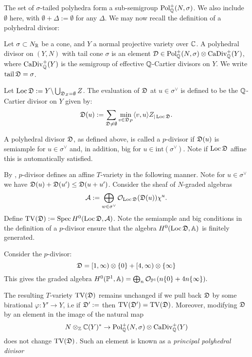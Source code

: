 The set of \(\sigma\)-tailed polyhedra form a sub-semigroup \(\operatorname{Pol}_{\mathbb{Q}}^+(N,\sigma)\). We also include \(\emptyset\) here, with \(\emptyset + \Delta := \emptyset\) for any \(\Delta\). We may now recall the definition of a polyhedral divisor:
\begin{definition}
Let \(\sigma \subset N_{\mathbb{R}}\) be a cone, and \(Y\) a normal projective variety over \(\mathbb{C}\). A polyhedral divisor on \((Y,N)\) with tail cone \(\sigma\) is an element \(\mathcal{D} \in \operatorname{Pol}_{\mathbb{Q}}^+(N,\sigma) \otimes \operatorname{CaDiv}_{\mathbb{Q}}^+(Y)\), where \(\operatorname{CaDiv}_{\mathbb{Q}}^+(Y)\) is the semigroup of effective \(\mathbb{Q}\)-Cartier divisors on \(Y\). We write \(\operatorname{tail} {\mathfrak{D}} = \sigma\).
\end{definition}
Let \(\operatorname{Loc} {\mathfrak{D}} := Y \backslash \bigcup_{{\mathfrak{D}}_Z = \emptyset} Z\). The evaluation of \({\mathfrak{D}}\) at \(u \in \sigma^\vee\) is defined to be the \(\mathbb{Q}\)-Cartier divisor on \(Y\) given by:
\[
{\mathfrak{D}}(u) :=  \sum_{{\mathfrak{D}} \neq \emptyset} \min_{v \in {\mathfrak{D}}_P} \langle v,u \rangle Z_{|\operatorname{Loc} {\mathfrak{D}}}.
\]
\begin{definition}
A polyhedral divisor \({\mathfrak{D}}\), as defined above, is called a \(p\)-divisor if \({\mathfrak{D}}(u)\) is semiample for \(u \in \sigma^\vee\) and, in addition, big for \(u \in \text{int}(\sigma^\vee)\). Note if \(\operatorname{Loc} {\mathfrak{D}}\) affine this is automatically satisfied.
\end{definition}

By \cite[Proposition 3.1]{hausen2018torus}, \(p\)-divisor defines an affine \(T\)-variety in the following manner. Note for \(u \in \sigma^\vee\) we have \({\mathfrak{D}}(u) + {\mathfrak{D}}(u') \le {\mathfrak{D}}(u+u')\). Consider the sheaf of \(N\)-graded algebras
\[
\mathcal{A} := \bigoplus_{w \in \sigma^{\vee}} \mathcal{O}_{\operatorname{Loc} {\mathfrak{D}}} ({\mathfrak{D}}(u)) \chi^u.
\]
Define \(\operatorname{TV}({\mathfrak{D}}) := \operatorname{Spec} H^0(\operatorname{Loc} {\mathfrak{D}}, \mathcal{A}) \). Note the semiample and big conditions in the definition of a \(p\)-divisor ensure that the algebra \(H^0(\operatorname{Loc} {\mathfrak{D}}, \mathbb{A})\) is finitely generated.
\begin{example}
Consider the \(p\)-divisor:
\[
{\mathfrak{D}} = [1,\infty) \otimes \{0\} + [4,\infty) \otimes \{\infty\}
\]
This gives the graded algebra \(H^0( \mathbb{P}^1, \mathbb{A}) = \bigoplus_n \mathcal{O}_{\mathbb{P}^1}( n \{0\} + 4n \{\infty\}).\)
\end{example}
The resulting \(T\)-variety \(\operatorname{TV}({\mathfrak{D}})\) remains unchanged if we pull back \({\mathfrak{D}}\) by some birational \(\varphi: Y' \to Y\), i.e if \({\mathfrak{D}}' := \) then \(\operatorname{TV}({\mathfrak{D}}') = \operatorname{TV}({\mathfrak{D}})\). Moreover, modifying \({\mathfrak{D}}\) by an element in the image of the natural map
\[
N \otimes_{\mathbb{Z}} \mathbb{C}(Y)^* \to \operatorname{Pol}_{\mathbb{Q}}^+(N,\sigma) \otimes \operatorname{CaDiv}_{\mathbb{Q}}^+(Y)
\]
does not change \(\operatorname{TV}({\mathfrak{D}})\). Such an element is known as a \textit{principal polyhedral divisor}


